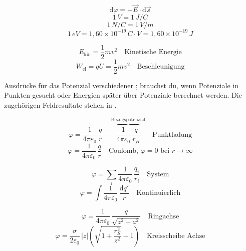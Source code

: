 \begin{formulabox}
\[ \mathrm{d}\varphi = -\vec{E}\cdot\mathrm{d}\vec{s} \]
\[ 1\,\si{V} = 1\,\si{J/C} \]
\[ 1\,\si{N/C} = 1\,\si{V/m} \]
\[ 1\,\si{eV} = 1{,}60\times 10^{-19}\,\si{C\cdot V} = 1{,}60\times 10^{-19}\,\si{J} \]
\end{formulabox}

\begin{formulabox}
\[ E_{\mathrm{kin}} = \frac{1}{2}mv^2 \quad \text{Kinetische Energie} \]
\[ W_{\mathrm{el}} = qU = \frac{1}{2}mv^2 \quad \text{Beschleunigung} \]
\end{formulabox}

\begin{runintext}
Ausdrücke für das Potenzial verschiedener ; brauchst du, wenn Potenziale in Punkten gesucht oder Energien später über Potenziale berechnet werden.
Die zugehörigen Feldresultate stehen in .
\end{runintext}
\begin{formulabox}
\[ \varphi = \frac{1}{4\pi\varepsilon_0}\,\frac{q}{r} - \overbrace{\frac{1}{4\pi\varepsilon_0}\,\frac{q}{r_B}}^{\text{Bezugspotenzial}} \quad \text{Punktladung} \]
\[ \varphi = \frac{1}{4\pi\varepsilon_0}\,\frac{q}{r} \quad \text{Coulomb, $\varphi=0$ bei $r\to\infty$} \]
\end{formulabox}

\begin{formulabox}
\[ \varphi = \sum_i \frac{1}{4\pi\varepsilon_0}\,\frac{q_i}{r_i} \quad \text{System} \]
\[ \varphi = \int \frac{1}{4\pi\varepsilon_0}\,\frac{\mathrm{d}q'}{r} \quad \text{Kontinuierlich} \]
\end{formulabox}

\begin{formulabox}
\[ \varphi = \frac{1}{4\pi\varepsilon_0}\,\frac{q}{\sqrt{z^2+a^2}} \quad \text{Ringachse} \]
\formulasep
\[ \varphi = \frac{\sigma}{2\varepsilon_0}\,|z|\left(\sqrt{1+\frac{r_S^2}{z^2}}-1\right) \quad \text{Kreisscheibe Achse} \]
\end{formulabox}

